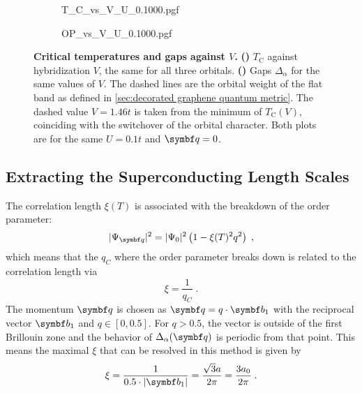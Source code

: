 \documentclass[../notes.tex]{subfiles}
\begin{document}
\begin{figure}[tb]
	\centering
	\begin{subfigure}[b]{0.5\textwidth}
		\centering
		\caption{\hfill\null}\label{sfig:decorated graphene critical temperatures vs V}
		{T_C_vs_V_U_0.1000.pgf}
	\end{subfigure}%
	\begin{subfigure}[b]{0.5\textwidth}
		\centering
		\caption{\hfill\null}\label{sfig:decorated graphene gaps vs V}
		{OP_vs_V_U_0.1000.pgf}
	\end{subfigure}
	\caption[Critical temperatures and gaps against \(V\).]{
		\textbf{Critical temperatures and gaps against \(V\).}
		\textbf{()} \(T_{\mathrm{C}}\) against hybridization \(V\), the same for all three orbitals. \textbf{()} Gaps \(\Delta_{\alpha}\) for the same values of \(V\). The dashed lines are the orbital weight of the flat band as defined in \cref{sec:decorated graphene quantum metric}. The dashed value \(V = 1.46t\) is taken from the minimum of \(T_{\mathrm{C}} (V)\), coinciding with the switchover of the orbital character. Both plots are for the same \(U = 0.1t\) and \(\vb{q} = 0\).
	} 
	\label{fig:decorated graphene TC and gaps against V}
\end{figure}

\subsection*{Extracting the Superconducting Length Scales}

The correlation length \(\xi (T)\) is associated with the breakdown of the order parameter:
\begin{equation}
	\vert \Psi_{\vb{q}} \vert^2 = \vert \Psi_{0} \vert^2 \left(1 - \xi(T)^2 q^2\right) \;,
\end{equation}
which means that the \(q_C\) where the order parameter breaks down is related to the correlation length via
\begin{equation}
	\xi = \frac{1}{q_C}\;.
\end{equation}
The momentum \(\vb{q}\) is chosen as \(\vb{q} = q \cdot \vb{b}_1\) with the reciprocal vector \(\vb{b}_1\) and \(q \in [0, 0.5]\).
For \(q > 0.5\), the vector is outside of the first Brillouin zone and the behavior of \(\Delta_{\alpha} (\vb{q})\) is periodic from that point.
This means the maximal \(\xi\) that can be resolved in this method is given by
\begin{equation}
	\xi = \frac{1}{0.5 \cdot \vert \vb{b}_1 \vert} = \frac{\sqrt{3} a}{2 \pi} = \frac{3 a_0}{2 \pi}\;.
\end{equation}
\end{document}
